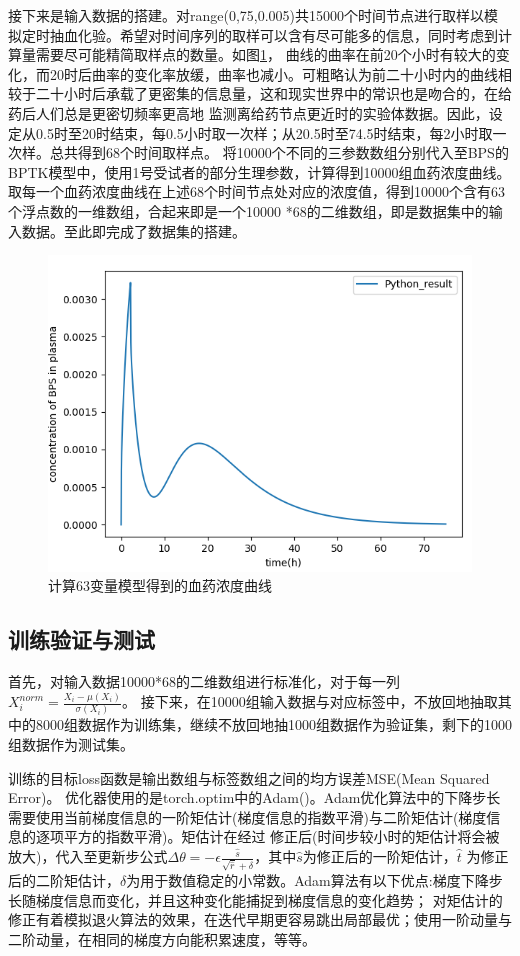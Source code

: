 \documentclass{article}
\begin{document}
接下来是输入数据的搭建。对range(0,75,0.005)共15000个时间节点进行取样以模拟定时抽血化验。希望对时间序列的取样可以含有尽可能多的信息，同时考虑到计算量需要尽可能精简取样点的数量。如图\ref{fig6}，
曲线的曲率在前20个小时有较大的变化，而20时后曲率的变化率放缓，曲率也减小。可粗略认为前二十小时内的曲线相较于二十小时后承载了更密集的信息量，这和现实世界中的常识也是吻合的，在给药后人们总是更密切频率更高地
监测离给药节点更近时的实验体数据。因此，设定从0.5时至20时结束，每0.5小时取一次样；从20.5时至74.5时结束，每2小时取一次样。总共得到68个时间取样点。
将10000个不同的三参数数组分别代入至BPS的BPTK模型中，使用1号受试者的部分生理参数，计算得到10000组血药浓度曲线。取每一个血药浓度曲线在上述68个时间节点处对应的浓度值，得到10000个含有63个浮点数的一维数组，合起来即是一个10000
*68的二维数组，即是数据集中的输入数据。至此即完成了数据集的搭建。
\begin{figure}[H]
  \centering
  \includegraphics[scale=0.5]{pic6.png}
  \caption{计算63变量模型得到的血药浓度曲线}
  \label{fig6}
\end{figure}



\subsection*{训练验证与测试}

首先，对输入数据10000*68的二维数组进行标准化，对于每一列$X^{norm}_i=\frac{X_i-\mu(X_i)}{\sigma(X_i) } $。
接下来，在10000组输入数据与对应标签中，不放回地抽取其中的8000组数据作为训练集，继续不放回地抽1000组数据作为验证集，剩下的1000组数据作为测试集。

训练的目标loss函数是输出数组与标签数组之间的均方误差MSE(Mean Squared Error)。
优化器使用的是torch.optim中的Adam()。Adam优化算法中的下降步长需要使用当前梯度信息的一阶矩估计(梯度信息的指数平滑)与二阶矩估计(梯度信息的逐项平方的指数平滑)。矩估计在经过
修正后(时间步较小时的矩估计将会被放大)，代入至更新步公式$\Delta \theta   = -\epsilon \frac{\hat{s}}{\sqrt{\hat{r}} +\delta } $，其中$\hat{s}$为修正后的一阶矩估计，$\hat{t}$
为修正后的二阶矩估计，$\delta$为用于数值稳定的小常数。Adam算法有以下优点:梯度下降步长随梯度信息而变化，并且这种变化能捕捉到梯度信息的变化趋势；
对矩估计的修正有着模拟退火算法的效果，在迭代早期更容易跳出局部最优；使用一阶动量与二阶动量，在相同的梯度方向能积累速度，等等。
\end{document}
